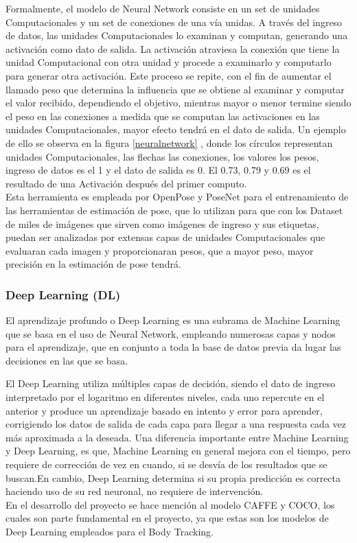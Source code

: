 Formalmente, el modelo de Neural Network consiste en un set de unidades Computacionales y un set de conexiones de una vía unidas. A través del ingreso de datos, las unidades Computacionales lo examinan y computan, generando una activación como dato de salida. La activación atraviesa la conexión que tiene la unidad Computacional con otra unidad y procede a examinarlo y computarlo para generar otra activación. 
Este proceso se repite, con el fin de aumentar el llamado peso que determina la influencia que se obtiene al examinar y computar el valor recibido, dependiendo el objetivo, mientras mayor o menor termine siendo el peso en las conexiones a medida que se computan las activaciones en las unidades Computacionales, mayor efecto tendrá en el dato de salida. 
Un ejemplo de ello se observa en la figura \ref{neuralnetwork} \cite{gallant1993neural}, donde los círculos representan unidades Computacionales, las flechas las conexiones, los valores los pesos, ingreso de datos es el 1 y el dato de salida es 0. El 0.73, 0.79 y 0.69 es el resultado de una Activación después del primer computo.
\\
Esta herramienta es empleada por OpenPose y PoseNet para el entrenamiento de las herramientas de estimación de pose, que lo utilizan para que con los Dataset de miles de imágenes que sirven como imágenes de ingreso y sus etiquetas, puedan ser analizadas por extensas capas de unidades Computacionales que evaluaran cada imagen y proporcionaran pesos, que a mayor peso, mayor precisión en la estimación de pose tendrá.

\subsubsection{Deep Learning (DL)}

El aprendizaje profundo o Deep Learning es una subrama de Machine Learning que se basa en el uso de Neural Network, empleando numerosas capas y nodos para el aprendizaje, que en conjunto a toda la base de datos previa da lugar las decisiones en las que se basa.

El Deep Learning utiliza múltiples capas de decisión, siendo el dato de ingreso interpretado por el logaritmo en diferentes niveles, cada uno repercute en el anterior y produce un aprendizaje basado en intento y error para aprender, corrigiendo los datos de salida de cada capa para llegar a una respuesta cada vez más aproximada a la deseada.
Una diferencia importante entre Machine Learning y Deep Learning, es que, Machine Learning en general mejora con el tiempo, pero requiere de corrección de vez en cuando, si se desvía de los resultados que se buscan.En cambio, Deep Learning determina si su propia predicción es correcta haciendo uso de su red neuronal, no requiere de intervención.
\\
En el desarrollo del proyecto se hace mención al modelo CAFFE y COCO, los cuales son parte fundamental en el proyecto, ya que estas son los modelos de Deep Learning empleados para el Body Tracking.

